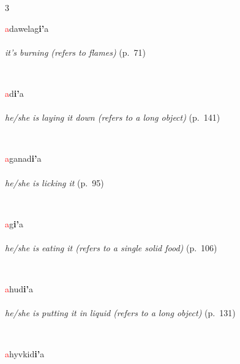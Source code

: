 \documentclass[oneside,openany]{book}%
\begin{document}
\noindent\begin{multicols}{3}%
\begin{minipage}[t]{\linewidth}
\raggedright\noindent \textcolor{Red}{a}dawelag\textbf{i'}a\\
\\
\noindent \textit{it's burning (refers to flames)} (p.~71)
\end{minipage}\\[1em]%
\begin{minipage}[t]{\linewidth}
\raggedright\noindent \textcolor{Red}{a}d\textbf{i'}a\\
\\
\noindent \textit{he/she is laying it down (refers to a long object)} (p.~141)
\end{minipage}\\[1em]%
\begin{minipage}[t]{\linewidth}
\raggedright\noindent \textcolor{Red}{a}ganad\textbf{i'}a\\
\\
\noindent \textit{he/she is licking it} (p.~95)
\end{minipage}\\[1em]%
\begin{minipage}[t]{\linewidth}
\raggedright\noindent \textcolor{Red}{a}g\textbf{i'}a\\
\\
\noindent \textit{he/she is eating it (refers to a single solid food)} (p.~106)
\end{minipage}\\[1em]%
\begin{minipage}[t]{\linewidth}
\raggedright\noindent \textcolor{Red}{a}hud\textbf{i'}a\\
\\
\noindent \textit{he/she is putting it in liquid (refers to a long object)} (p.~131)
\end{minipage}\\[1em]%
\begin{minipage}[t]{\linewidth}
\raggedright\noindent \textcolor{Red}{a}hyvkid\textbf{i'}a\\
\\

\end{minipage}
\end{multicols}
\end{document}
